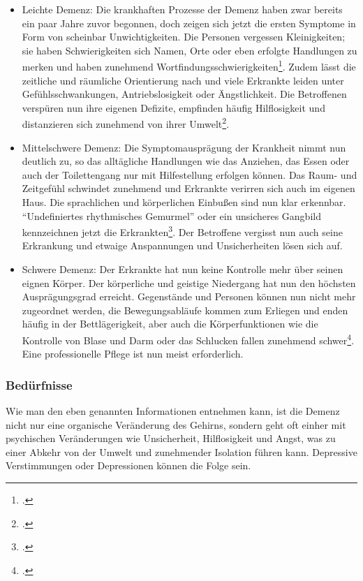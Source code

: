 \begin{itemize}
\item Leichte Demenz: Die krankhaften Prozesse der Demenz haben zwar bereits ein paar Jahre zuvor begonnen, doch zeigen sich jetzt die ersten Symptome in Form von scheinbar Unwichtigkeiten. Die Personen vergessen Kleinigkeiten; sie haben Schwierigkeiten sich Namen, Orte oder eben erfolgte Handlungen zu merken und haben zunehmend Wortfindungsschwierigkeiten\footcite[vgl.][15]{Giruc2011}. Zudem lässt die zeitliche und räumliche Orientierung nach und viele Erkrankte leiden unter Gefühlsschwankungen, Antriebslosigkeit oder Ängstlichkeit. Die Betroffenen verspüren nun ihre eigenen Defizite, empfinden häufig Hilflosigkeit und distanzieren sich zunehmend von ihrer Umwelt\footcite[vgl.][15f]{Giruc2011}.

\item Mittelschwere Demenz: Die Symptomausprägung der Krankheit nimmt nun deutlich zu, so das alltägliche Handlungen wie das Anziehen, das Essen oder auch der Toilettengang nur mit Hilfestellung erfolgen können. Das Raum- und Zeitgefühl schwindet zunehmend und Erkrankte verirren sich auch im eigenen Haus. Die sprachlichen und körperlichen Einbußen sind nun klar erkennbar. "`Undefiniertes rhythmisches Gemurmel"' oder ein unsicheres Gangbild kennzeichnen jetzt die Erkrankten\footcite[vgl.][16f]{Giruc2011}. Der Betroffene vergisst nun auch seine Erkrankung und etwaige Anspannungen und Unsicherheiten lösen sich auf.

\item Schwere Demenz: Der Erkrankte hat nun keine Kontrolle mehr über seinen eignen Körper. Der körperliche und geistige Niedergang  hat nun den höchsten Ausprägungsgrad erreicht. Gegenstände und Personen können nun nicht mehr zugeordnet werden, die Bewegungsabläufe kommen zum Erliegen und enden häufig in der Bettlägerigkeit, aber auch die Körperfunktionen wie die Kontrolle von Blase und Darm oder das Schlucken fallen zunehmend schwer\footcite[vgl.][17]{Giruc2011}. Eine professionelle Pflege ist nun meist erforderlich.
\end{itemize}

\subsubsection{Bedürfnisse }
\label{sec:k2.2.3_Beduerfnisse}

Wie man den eben genannten Informationen entnehmen kann, ist die Demenz nicht nur eine organische Veränderung des Gehirns, sondern geht oft einher mit psychischen Veränderungen wie Unsicherheit, Hilflosigkeit und Angst, was zu einer Abkehr von der Umwelt und zunehmender Isolation führen kann. Depressive Verstimmungen oder Depressionen können die Folge sein. 
 
